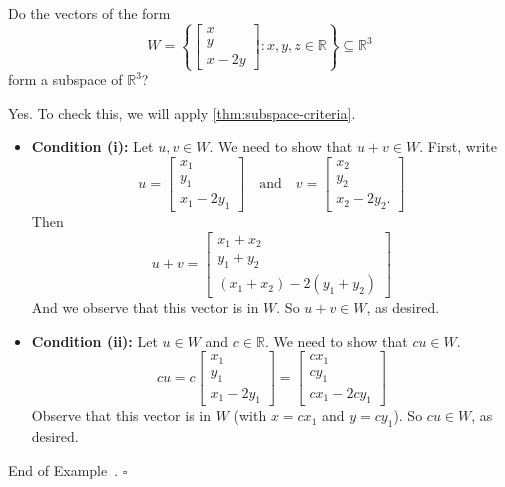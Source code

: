 \documentclass[10pt]{article}
\theoremstyle{definition}
\newtheorem{example}[theorem]{Example}
\renewenvironment{example}
{\begin{oldexample}}
  {\par\smallskip\hfill   End of Example~\theexample. $\square$    \par\end{oldexample}}
\newcommand{\R}{\mathbb{R}}           %
\begin{document}
\begin{example}
  Do the vectors of the form
  \begin{equation*}
    W=\left\{\begin{bmatrix}
        x\\y\\x-2y
      \end{bmatrix}: x,y,z\in \R\right\}\subseteq \R^{3} 
  \end{equation*}
  form a subspace of $\R^{3}$?

  Yes. To check this, we will apply \cref{thm:subspace-criteria}.
  \begin{itemize}
    \item \textbf{Condition (i):} Let $u,v\in W$. We need to show that $u+v\in
    W$. First, write
    \begin{equation*}
      u =
      \begin{bmatrix}
        x_{1}\\y_{1}\\x_{1}-2y_{1}
      \end{bmatrix}
      \quad \text{and} \quad 
      v =
      \begin{bmatrix}
        x_{2}\\y_{2}\\x_{2}-2y_{2}.
      \end{bmatrix}
    \end{equation*}
    Then
    \begin{equation*}
      u+v =
      \begin{bmatrix}
        x_{1}+x_{2}\\
        y_{1}+y_{2}\\
        (x_{1}+x_{2}) -2(y_{1}+y_{2})
      \end{bmatrix}
    \end{equation*}
    And we observe that this vector is in $W$. So $u+v\in W$, as desired.
    \item \textbf{Condition (ii):} Let $u\in W$ and $c\in \R$. We need to show
    that $cu\in W$.
    \begin{equation*}
      cu =c
      \begin{bmatrix}
        x_{1}\\y_{1}\\x_{1}-2y_{1}
      \end{bmatrix}
      =
      \begin{bmatrix}
        cx_{1}\\cy_{1}\\cx_{1}-2cy_{1}
      \end{bmatrix}
    \end{equation*}
    Observe that this vector is in $W$ (with $x=cx_{1}$ and $y=cy_{1}$). So
    $cu\in W$, as desired.
  \end{itemize}
\end{example}
\end{document}
